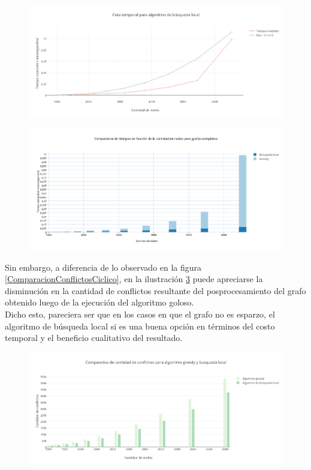  \begin{figure}[H]
    \centering
  	\includegraphics[width=18cm]{imagenes/Ej5/TiemposLocalCompleto.png}
    \caption{}
 	  \label{TiemposLocalCompleto}
  \end{figure}

 \begin{figure}[H]
    \centering
  	\includegraphics[width=18cm]{imagenes/Ej5/ComparacionTiemposCompleto.png}
    \caption{}
 	  \label{ComparacionTiemposCompleto}
  \end{figure}

Sin embargo, a diferencia de lo observado en la figura \ref{ComparacionConflictosCiclico}, en la ilustración \ref{ComparacionConflictosCompleto} puede apreciarse la disminución en la cantidad de conflictos resultante del posprocesamiento del grafo obtenido luego de la ejecución del algoritmo goloso.\\
Dicho esto, pareciera ser que en los casos en que el grafo no es esparzo, el algoritmo de búsqueda local si es una buena opción en términos del costo temporal y el beneficio cualitativo del resultado.

 \begin{figure}[H]
    \centering
  	\includegraphics[width=18cm]{imagenes/Ej5/ComparacionConflictosCompleto.png}
    \caption{}
 	  \label{ComparacionConflictosCompleto}
  \end{figure}

